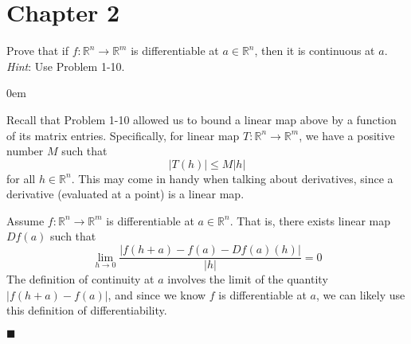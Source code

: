 \documentclass[12pt]{article}
\renewcommand{\qed}{\hfill$\blacksquare$}
\renewenvironment{proof}{\begin{addmargin}[1em]{0em}\begin{newproof}}{\end{newproof}\end{addmargin}\qed}
\newenvironment{problem}[2][Problem]{\begin{trivlist}
\item[\hskip \labelsep {\bfseries #1}\hskip \labelsep {\bfseries #2.}]}{\end{trivlist}}
\begin{document}
 
 
 
 
 
 
 
 
\section*{Chapter 2}

\begin{problem}{2.1}
Prove that if $f:\mathbb{R}^n \rightarrow \mathbb{R}^m$ is differentiable at $a\in \mathbb{R}^n$, then it is continuous at $a$. \textit{Hint}: Use Problem 1-10.
\end{problem}

\begin{proof}
Recall that Problem 1-10 allowed us to bound a linear map above by a function of its matrix entries. Specifically, for linear map $T: \mathbb{R}^n \rightarrow \mathbb{R}^m$, we have a positive number $M$ such that
$$ \left|T\left(h\right)\right| \leq M \left| h\right| $$
for all $h \in \mathbb{R}^n$. This may come in handy when talking about derivatives, since a derivative (evaluated at a point) is a linear map.

Assume $f:\mathbb{R}^n\rightarrow \mathbb{R}^m$ is differentiable at $a\in \mathbb{R}^n$. That is, there exists linear map $Df\left(a\right)$ such that 
$$ \lim_{h\rightarrow 0} \frac{\left|f\left(h+a\right)-f\left(a\right) - Df\left(a\right) \left(h\right)\right|}{\left|h\right|}=0 $$ The definition of continuity at $a$ involves the limit of the quantity $ \left| f\left(h+a\right) - f\left(a\right)\right|$, and since we know $f$ is differentiable at $a$, we can likely use this definition of differentiability. 


\end{proof}
\end{document}
